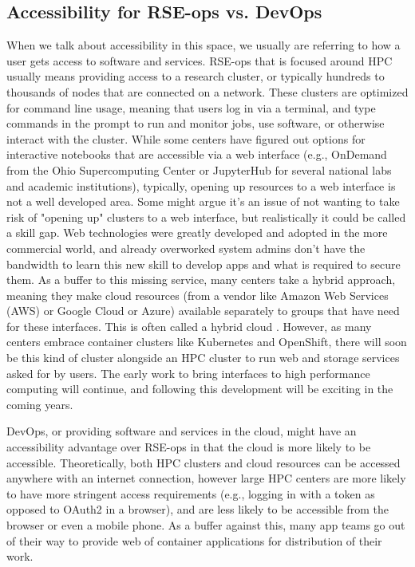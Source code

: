 \subsection{Accessibility for RSE-ops vs. DevOps}

When we talk about accessibility in this space, we usually are referring to how a user gets access to software and services. RSE-ops that is focused around HPC usually means providing access to a research cluster, or typically hundreds to thousands of nodes that are connected on a network. These clusters are optimized for command line usage, meaning that users log in via a terminal, and type commands in the prompt to run and monitor jobs, use software, or otherwise interact with the cluster. While some centers have figured out options for interactive notebooks that are accessible via a web interface (e.g., OnDemand from the Ohio Supercomputing Center \cite{ondemand} or JupyterHub \cite{juypterhub} for several national labs and academic institutions), typically, opening up resources to a web interface is not a well developed area. Some might argue it's an issue of not wanting to take risk of "opening up" clusters to a web interface, but realistically it could be called a skill gap.  Web technologies were greatly developed and adopted in the more commercial world, and already overworked system admins don't have the bandwidth to learn this new skill to develop apps and what is required to secure them. As a buffer to this missing service, many centers take a hybrid approach, meaning they make cloud resources (from a vendor like Amazon Web Services (AWS) or Google Cloud or Azure) available separately to groups that have need for these interfaces. This is often called a hybrid cloud \cite{hybrid-cloud}. However, as many centers embrace container clusters like Kubernetes and OpenShift, there will soon be this kind of cluster alongside an HPC cluster to run web and storage services asked for by users. The early work to bring interfaces to high performance computing \cite{web-interfaces} will continue, and following this development will be exciting in the coming years.

DevOps, or providing software and services in the cloud, might have an accessibility advantage over RSE-ops in that the cloud is more likely to be accessible. Theoretically, both HPC clusters and cloud resources can be accessed anywhere with an internet connection, however large HPC centers are more likely to have more stringent access requirements (e.g., logging in with a token as opposed to OAuth2 in a browser), and are less likely to be accessible from the browser or even a mobile phone. As a buffer against this, many app teams go out of their way to provide web of container applications for distribution of their work.

